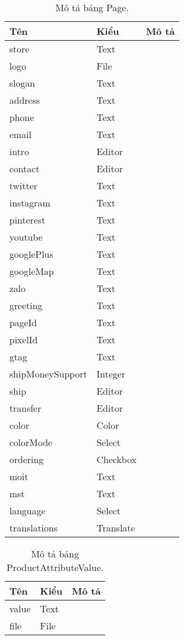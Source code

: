\begin{table}[p]
\begin{center}
\begin{tabular}{ |l|l|l| } 
	\hline
	Tên & Kiểu & Mô tả \\
	\hline
	store & Text & \dotfill \\
logo & File & \dotfill \\
slogan & Text & \dotfill \\
address & Text & \dotfill \\
phone & Text & \dotfill \\
email & Text & \dotfill \\
intro & Editor & \dotfill \\
contact & Editor & \dotfill \\
twitter & Text & \dotfill \\
instagram & Text & \dotfill \\
pinterest & Text & \dotfill \\
youtube & Text & \dotfill \\
googlePlus & Text & \dotfill \\
googleMap & Text & \dotfill \\
zalo & Text & \dotfill \\
greeting & Text & \dotfill \\
pageId & Text & \dotfill \\
pixelId & Text & \dotfill \\
gtag & Text & \dotfill \\
shipMoneySupport & Integer & \dotfill \\
ship & Editor & \dotfill \\
transfer & Editor & \dotfill \\
color & Color & \dotfill \\
colorMode & Select & \dotfill \\
ordering & Checkbox & \dotfill \\
moit & Text & \dotfill \\
mst & Text & \dotfill \\
language & Select & \dotfill \\
translations & Translate & \dotfill \\ 
	\hline
\end{tabular}
	\caption{Mô tả bảng Page.}
	\label{table:Page}
\end{center}
\end{table}


\begin{table}[p]
\begin{center}
\begin{tabular}{ |l|l|l| } 
	\hline
	Tên & Kiểu & Mô tả \\
	\hline
	value & Text & \dotfill \\
file & File & \dotfill \\ 
	\hline
\end{tabular}
	\caption{Mô tả bảng ProductAttributeValue.}
	\label{table:ProductAttributeValue}
\end{center}
\end{table}


